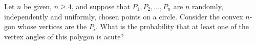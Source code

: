 Let $n$ be given, $n \geq 4$, and suppose that $P_1, P_2, \dots, P_n$
are $n$ randomly, independently and uniformly, chosen points on a circle.
Consider the convex $n$-gon whose vertices are the $P_i$. What is the
probability that at least one of the vertex angles of this polygon is
acute?

